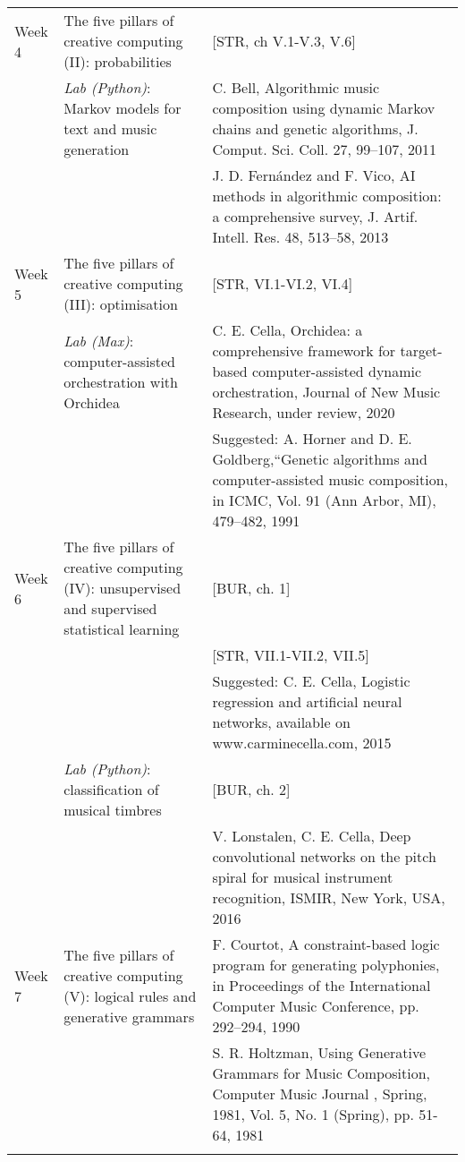 \documentclass[letterpaper]{inzane_syllabus} %
\begin{document}
\begin{center}
\begin{tabularx}{\textwidth}{p{2cm}p{8cm} @{\hskip 0.5cm} p{9.5cm}}
Week 4 & The five pillars of creative computing (II): probabilities & [STR, ch V.1-V.3, V.6] \\

& \emph{Lab (Python)}: Markov models for text and music generation & C. Bell, Algorithmic music composition using dynamic Markov chains and genetic algorithms, J. Comput. Sci. Coll. 27, 99–107, 2011\\
& & J. D. Fern\'andez and F. Vico, AI methods in algorithmic composition: a comprehensive survey, J. Artif. Intell. Res. 48, 513–58, 2013 \\
\arrayrulecolor{maingray}\hline

Week 5 & The five pillars of creative computing (III): optimisation &  [STR, VI.1-VI.2, VI.4]\\
 
& \emph{Lab (Max)}: computer-assisted orchestration with Orchidea & C. E. Cella, Orchidea: a comprehensive framework for target-based computer-assisted dynamic orchestration, Journal of New Music Research, under review, 2020 \\
& &  Suggested: A. Horner and D. E. Goldberg,“Genetic algorithms and computer-assisted  music composition, in ICMC, Vol. 91 (Ann Arbor, MI), 479–482, 1991 \\
\arrayrulecolor{maingray}\hline

Week 6 & The five pillars of creative computing (IV): unsupervised and supervised statistical learning & [BUR, ch. 1]\\
& & [STR, VII.1-VII.2, VII.5]\\
& &  Suggested: C. E. Cella, Logistic regression and artificial neural networks, available on www.carminecella.com, 2015 \\

& \emph{Lab (Python)}: classification of musical timbres & [BUR, ch. 2] \\

& & V. Lonstalen, C. E. Cella, Deep convolutional networks on the pitch spiral for musical instrument recognition, ISMIR, New York, USA, 2016\\

\arrayrulecolor{maingray}\hline

Week 7 & The five pillars of creative computing (V): logical rules and generative grammars & F. Courtot, A constraint-based logic program for generating polyphonies, in Proceedings of the International Computer Music Conference, pp. 292–294, 1990 \\
& &  S. R. Holtzman, Using Generative Grammars for Music Composition, Computer Music Journal , Spring, 1981, Vol. 5, No. 1 (Spring), pp. 51-64, 1981\\
& & \\


\end{tabularx}
\end{center}
\end{document}
